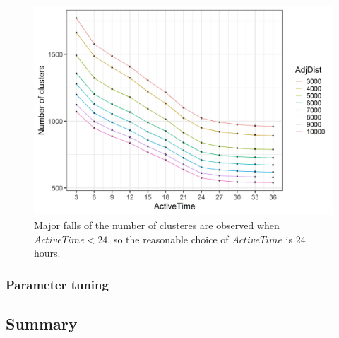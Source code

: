 \begin{Schunk}
\begin{figure}

{\centering \includegraphics[width=0.8\linewidth]{figures/clustering_tuning_2} 

}

\caption[Major falls of the number of clusteres are observed when $ActiveTime < 24$, so the reasonable choice of $ActiveTime$ is 24 hours]{Major falls of the number of clusteres are observed when $ActiveTime < 24$, so the reasonable choice of $ActiveTime$ is 24 hours.}\label{fig:vis2}
\end{figure}
\end{Schunk}

\hypertarget{parameter-tuning}{%
\subsubsection{Parameter tuning}\label{parameter-tuning}}

\hypertarget{summary}{%
\subsection{Summary}\label{summary}}




\address{%
Weihao Li\\
Monash University\\%
Econometrics and Business Statistics\\
%
%
%
\\\href{mailto:weihao.li@monash.edu}{\nolinkurl{weihao.li@monash.edu}}
}

\address{%
Emily Dodwell\\
??\\%
line 1\\ line 2\\
%
%
%
\\\href{mailto:emdodwell@gmail.com}{\nolinkurl{emdodwell@gmail.com}}
}

\address{%
Dianne Cook\\
Monash University\\%
Econometrics and Business Statistics\\
%
%
%
\\\href{mailto:dicook@monash.edu}{\nolinkurl{dicook@monash.edu}}
}

